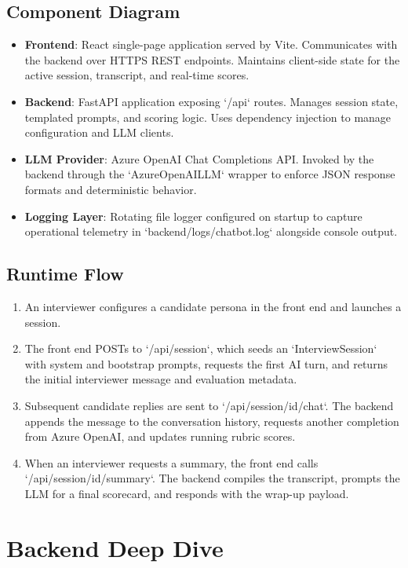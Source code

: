 \documentclass[11pt]{article}
\begin{document}
\subsection{Component Diagram}
\begin{itemize}[leftmargin=*]
  \item \textbf{Frontend}: React single-page application served by Vite. Communicates with the backend over HTTPS REST endpoints. Maintains client-side state for the active session, transcript, and real-time scores.
  \item \textbf{Backend}: FastAPI application exposing `/api` routes. Manages session state, templated prompts, and scoring logic. Uses dependency injection to manage configuration and LLM clients.
  \item \textbf{LLM Provider}: Azure OpenAI Chat Completions API. Invoked by the backend through the `AzureOpenAILLM` wrapper to enforce JSON response formats and deterministic behavior.
  \item \textbf{Logging Layer}: Rotating file logger configured on startup to capture operational telemetry in `backend/logs/chatbot.log` alongside console output.
\end{itemize}

\subsection{Runtime Flow}
\begin{enumerate}[leftmargin=*]
  \item An interviewer configures a candidate persona in the front end and launches a session.
  \item The front end POSTs to `/api/session`, which seeds an `InterviewSession` with system and bootstrap prompts, requests the first AI turn, and returns the initial interviewer message and evaluation metadata.
  \item Subsequent candidate replies are sent to `/api/session/{id}/chat`. The backend appends the message to the conversation history, requests another completion from Azure OpenAI, and updates running rubric scores.
  \item When an interviewer requests a summary, the front end calls `/api/session/{id}/summary`. The backend compiles the transcript, prompts the LLM for a final scorecard, and responds with the wrap-up payload.
\end{enumerate}

\section{Backend Deep Dive}
\end{document}
